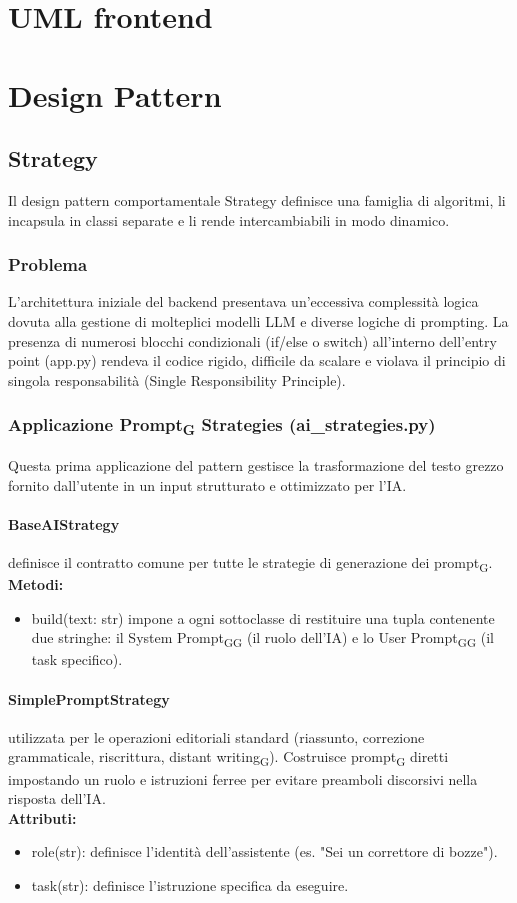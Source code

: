 \documentclass[11pt,a4paper]{article}
\newcommand{\gls}[1]{#1\textsubscript{G}}
\begin{document}
\section{UML frontend}

\section{Design Pattern}
\subsection{Strategy}
Il design pattern comportamentale Strategy definisce una famiglia di algoritmi, li incapsula in classi separate e li rende intercambiabili in modo dinamico.
\subsubsection{Problema}
L’architettura iniziale del backend presentava un'eccessiva complessità logica dovuta alla gestione di molteplici modelli LLM e diverse logiche di prompting. La presenza di numerosi blocchi condizionali (if/else o switch) all'interno dell'entry point (app.py) rendeva il codice rigido, difficile da scalare e violava il principio di singola responsabilità (Single Responsibility Principle).
\subsubsection{Applicazione \gls{Prompt} Strategies (ai\_strategies.py)}
Questa prima applicazione del pattern gestisce la trasformazione del testo grezzo fornito dall'utente in un input strutturato e ottimizzato per l'IA.

\paragraph{BaseAIStrategy} definisce il contratto comune per tutte le strategie di generazione dei \gls{prompt}.
\textbf{Metodi:}
\begin{itemize}
    \item build(text: str) impone a ogni sottoclasse di restituire una tupla contenente due stringhe: il \gls{System \gls{Prompt}} (il ruolo dell'IA) e lo \gls{User \gls{Prompt}} (il task specifico).
\end{itemize}
\paragraph{SimplePromptStrategy} utilizzata per le operazioni editoriali standard (riassunto, correzione grammaticale, riscrittura, \gls{distant writing}). Costruisce \gls{prompt} diretti impostando un ruolo e istruzioni ferree per evitare preamboli discorsivi nella risposta dell'IA.\\
\textbf{Attributi:}
\begin{itemize}
    \item role(str): definisce l'identità dell'assistente (es. "Sei un correttore di bozze").
    \item task(str): definisce l'istruzione specifica da eseguire.
\end{itemize}
\end{document}
